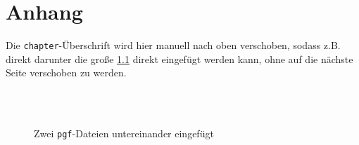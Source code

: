 \renewcommand*\chapterheadstartvskip{\vspace*{-2.5cm}}
\chapter{Anhang}
Die \texttt{chapter}-Überschrift wird hier manuell nach oben verschoben, sodass z.B. direkt darunter die große \cref{fig:twopgffiles} direkt eingefügt werden kann, ohne auf die nächste Seite verschoben zu werden.
\begin{figure}[!h]
\vspace*{-0.0cm}%
  \\
  \\
    \caption[Zwei \texttt{pgf}-Dateien untereinander eingefügt]{Zwei \texttt{pgf}-Dateien untereinander eingefügt}
\label{fig:twopgffiles}
\end{figure}

